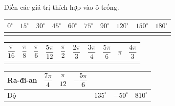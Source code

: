\begin{bt}%
	Điền các giá trị thích hợp vào ô trống.
	\begin{center}
		\renewcommand{\arraystretch}{2}
		\begin{tabular}{|>{\centering\arraybackslash}m{1cm}|>{\centering\arraybackslash}m{1cm}|>{\centering\arraybackslash}m{1cm}|>{\centering\arraybackslash}m{1cm}|>{\centering\arraybackslash}m{1cm}|>{\centering\arraybackslash}m{1cm}|>{\centering\arraybackslash}m{1cm}|>{\centering\arraybackslash}m{1cm}|>{\centering\arraybackslash}m{1cm}|>{\centering\arraybackslash}m{1cm}|}
			\hline
			$0^\circ$ & $15^\circ$ & $30^\circ$ & $45^\circ$ & $60^\circ$ & $75^\circ$ & $90^\circ$ & $120^\circ$ & $150^\circ$ & $180^\circ$\\
			\hline
			&&&&&&&&&\\
			\hline
		\end{tabular}
	\end{center}
	\begin{center}
		\renewcommand{\arraystretch}{2}
		\begin{tabular}{|>{\centering\arraybackslash}m{1cm}|>{\centering\arraybackslash}m{1cm}|>{\centering\arraybackslash}m{1cm}|>{\centering\arraybackslash}m{1cm}|>{\centering\arraybackslash}m{1cm}|>{\centering\arraybackslash}m{1cm}|>{\centering\arraybackslash}m{1cm}|>{\centering\arraybackslash}m{1cm}|>{\centering\arraybackslash}m{1cm}|>{\centering\arraybackslash}m{1cm}|}
			\hline
			$\dfrac{\pi}{16}$ & $\dfrac{\pi}{8}$ & $\dfrac{\pi}{6}$ & $\dfrac{5\pi}{12}$ & $\dfrac{\pi}{2}$ & $\dfrac{2\pi}{3}$ & $\dfrac{3\pi}{4}$ & $\dfrac{5\pi}{6}$ & $\pi$ & $\dfrac{4\pi}{3}$\\
			\hline
			&&&&&&&&&\\
			\hline
		\end{tabular}
	\end{center}
	\begin{center}
		\renewcommand{\arraystretch}{2}
		\begin{tabular}{|>{\centering\arraybackslash}m{2cm}|>{\centering\arraybackslash}m{2cm}|>{\centering\arraybackslash}m{2cm}|>{\centering\arraybackslash}m{2cm}|>{\centering\arraybackslash}m{2cm}|>{\centering\arraybackslash}m{2cm}|>{\centering\arraybackslash}m{2cm}|}
			\hline
			Ra-đi-an & $\dfrac{7\pi}{4}$ & $\dfrac{\pi}{12}$ & $-\dfrac{5\pi}{6}$ & & & \\
			\hline
			Độ & & & & $135^\circ$ & $-50^\circ$ & $810^\circ$\\

\end{tabular}
\end{center}
\end{bt}
